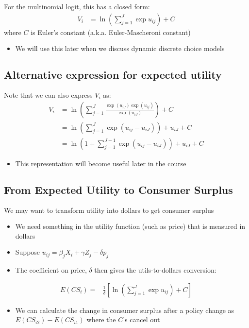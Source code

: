 \documentclass[11pt]{article}
\begin{document}
For the multinomial logit, this has a closed form:
\begin{align}
V_i&=\ln\left(\sum_{j=1}^J\exp{u_{ij}}\right)+C
\end{align}
where \(C\) is Euler's constant (a.k.a. Euler-Mascheroni constant)

\begin{itemize}
\item We will use this later when we discuss dynamic discrete choice models
\end{itemize}

\subsection{Alternative expression for expected utility}
\label{sec:orgf493b53}

Note that we can also express \(V_i\) as:
\begin{align*}
V_i&=\ln\left(\sum_{j=1}^J\frac{\exp(u_{iJ})\exp(u_{ij})}{\exp(u_{iJ})}\right)+C\\
&=\ln\left(\sum_{j=1}^J\exp(u_{ij}-u_{iJ})\right)+u_{iJ}+C\\
&=\ln\left(1+\sum_{j=1}^{J-1}\exp(u_{ij}-u_{iJ})\right)+u_{iJ}+C
\end{align*}

\begin{itemize}
\item This representation will become useful later in the course
\end{itemize}


\subsection{From Expected Utility to Consumer Surplus}
\label{sec:org1f9e77c}

We may want to transform utility into dollars to get consumer surplus  

\begin{itemize}
\item We need something in the utility function (such as price) that is measured in dollars

\item Suppose \(u_{ij}=\beta_jX_i+\gamma Z_j-\delta p_j\)

\item The coefficient on price, \(\delta\) then gives the utils-to-dollars conversion:
\end{itemize}
\begin{align}
E(CS_i)=&\frac{1}{\delta}\left[\ln\left(\sum_{j=1}^J\exp{u_{ij}}\right)+C\right]
\end{align}
\begin{itemize}
\item We can calculate the change in consumer surplus after a policy change as \(E(CS_{i2})-E(CS_{i1})\) where the \(C\)'s cancel out
\end{itemize}
\end{document}
